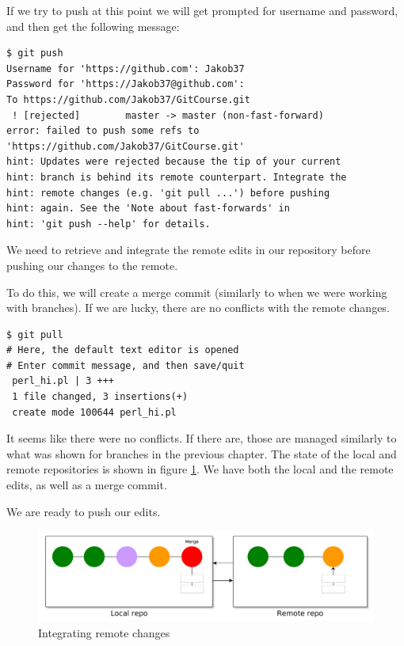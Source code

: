 \documentclass[../main/git_course_main.tex]{subfiles}
\begin{document}
If we try to push at this point we will get prompted for username and password, and then
get the following message:

\begin{codebox}
\begin{lstlisting}
$ git push
Username for 'https://github.com': Jakob37
Password for 'https://Jakob37@github.com': 
To https://github.com/Jakob37/GitCourse.git
 ! [rejected]        master -> master (non-fast-forward)
error: failed to push some refs to 
'https://github.com/Jakob37/GitCourse.git'
hint: Updates were rejected because the tip of your current 
hint: branch is behind its remote counterpart. Integrate the 
hint: remote changes (e.g. 'git pull ...') before pushing 
hint: again. See the 'Note about fast-forwards' in 
hint: 'git push --help' for details.
\end{lstlisting}
\end{codebox}

We need to retrieve and integrate the remote edits in our repository before pushing
our changes to the remote.

To do this, we will create a merge commit (similarly to when we were working with branches). If we are lucky, there are no conflicts with the remote changes.

\begin{codebox}
\begin{lstlisting}
$ git pull
# Here, the default text editor is opened
# Enter commit message, and then save/quit
 perl_hi.pl | 3 +++
 1 file changed, 3 insertions(+)
 create mode 100644 perl_hi.pl
\end{lstlisting}
\end{codebox}

It seems like there were no conflicts. If there are, those are managed similarly to what was shown for branches in the previous chapter. The state of the local and remote repositories is shown in figure \ref{fig:integrated_remote_changes}. We have both the local and the remote edits, as well as a merge commit.

We are ready to push our edits.

\begin{figure}[h!]
	\centering
	\includegraphics[width=1.0\textwidth]{../visualizations/chapter5/56_integrating_remote_changes.pdf}
	\caption{Integrating remote changes}
	\label{fig:integrated_remote_changes}
\end{figure}
\end{document}
